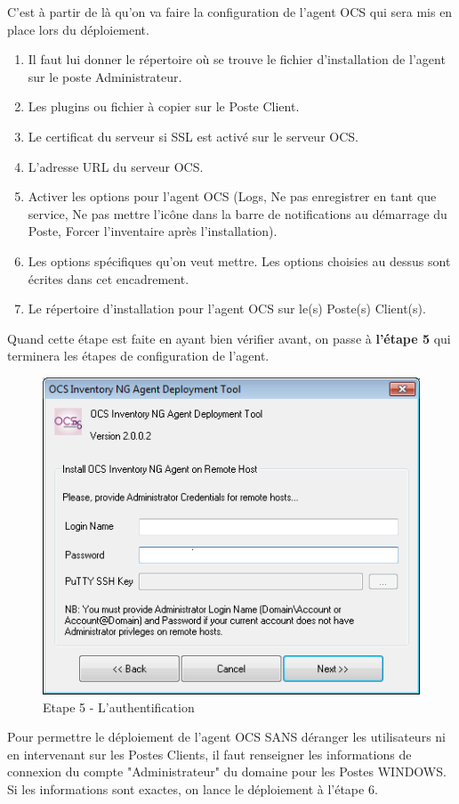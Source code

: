 \documentclass[11pt,a4paper,oneside]{article}
\begin{document}
C'est à partir de là qu'on va faire la configuration de l'agent OCS qui sera mis en place lors du déploiement.  
\begin{enumerate}
\item Il faut lui donner le répertoire où se trouve le fichier d'installation de l'agent sur le poste Administrateur.
\item Les plugins ou fichier à copier sur le Poste Client.
\item Le certificat du serveur si SSL est activé sur le serveur OCS.
\item L'adresse URL du serveur OCS.
\item Activer les options pour l'agent OCS (Logs, Ne pas enregistrer en tant que service, Ne pas mettre l'icône dans la barre de notifications au démarrage du Poste, Forcer l'inventaire après l'installation).
\item Les options spécifiques qu'on veut mettre. Les options choisies au dessus sont écrites dans cet encadrement.
\item Le répertoire d'installation pour l'agent OCS sur le(s) Poste(s) Client(s).
\end{enumerate}
Quand cette étape est faite en ayant bien vérifier avant, on passe à \textbf{l'étape 5} qui terminera les étapes de configuration de l'agent.
\newpage
\begin{figure}[hbtp]
\centering
\includegraphics[scale=0.9]{Script/5.png}
\caption{Etape 5 - L'authentification}
\end{figure}

Pour permettre le déploiement de l'agent OCS SANS déranger les utilisateurs ni en intervenant sur les Postes Clients, il faut renseigner les informations de connexion du compte "Administrateur" du domaine pour les Postes WINDOWS. Si les informations sont exactes, on lance le déploiement à l'étape 6.
\end{document}

